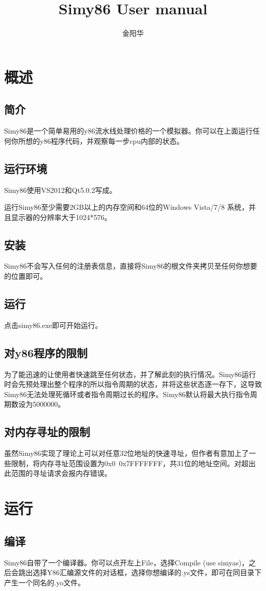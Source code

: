 \documentclass[a4paper,12pt]{article}
\title{\bf\LARGE{Simy86 User manual}}
\author{金阳华}
\begin{document}
\maketitle
\vspace{1.25cm}
\tableofcontents
\newpage

\section{概述}
\subsection{简介}
Simy86是一个简单易用的y86流水线处理价格的一个模拟器。你可以在上面运行任何你所想的y86程序代码，并观察每一步cpu内部的状态。
\subsection{运行环境}
Simy86使用VS2012和Qt5.0.2写成。


运行Simy86至少需要2GB以上的内存空间和64位的Windows Vista/7/8 系统，并且显示器的分辨率大于1024*576。
\subsection{安装}
Simy86不会写入任何的注册表信息，直接将Simy86的根文件夹拷贝至任何你想要的位置即可。
\subsection{运行}
点击simy86.exe即可开始运行。
\subsection{对y86程序的限制}
为了能迅速的让使用者快速跳至任何状态，并了解此刻的执行情况。Simy86运行时会先预处理出整个程序的所以指令周期的状态，并将这些状态逐一存下，这导致Simy86无法处理死循环或者指令周期过长的程序。Simy86默认将最大执行指令周期数设为5000000。
\subsection{对内存寻址的限制}
虽然Simy86实现了理论上可以对任意32位地址的快速寻址，但作者有意加上了一些限制，将内存寻址范围设置为0x0~0x7FFFFFFF，共31位的地址空间。对超出此范围的寻址请求会报内存错误。
\newpage
\section{运行}
\subsection{编译}
Simy86自带了一个编译器。你可以点开左上File，选择Compile (use simyas)，之后会跳出选择Y86汇编源文件的对话框，选择你想编译的.ys文件，即可在同目录下产生一个同名的.yo文件。
\end{document}
